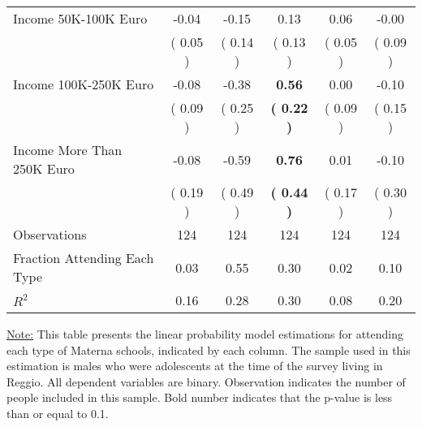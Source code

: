 \begin{table}[H]
{\begin{tabular}{lccccc}
\quad Income 50K-100K Euro &     -0.04 &     -0.15 &      0.13 &      0.06 &     -0.00 \\
\quad  & (     0.05 ) & (     0.14 )  & (     0.13 )  & (     0.05 ) & (     0.09 ) \\
\quad Income 100K-250K Euro &     -0.08 &     -0.38 & \textbf{     0.56} &      0.00 &     -0.10 \\
\quad  & (     0.09 ) & (     0.25 )  & \textbf{(     0.22 )}  & (     0.09 ) & (     0.15 ) \\
\quad Income More Than 250K Euro &     -0.08 &     -0.59 & \textbf{     0.76} &      0.01 &     -0.10 \\
\quad  & (     0.19 ) & (     0.49 )  & \textbf{(     0.44 )}  & (     0.17 ) & (     0.30 ) \\
\midrule
Observations & 124 & 124 & 124 & 124 & 124 \\
Fraction Attending Each Type &      0.03 &      0.55 &      0.30 &      0.02 &      0.10 \\
\midrule
$ R^2$ &      0.16 &      0.28 &      0.30 &      0.08 &      0.20 \\
\bottomrule
\end{tabular}}
\end{table}
\begin{footnotesize}
\noindent\underline{Note:} This table presents the linear probability model estimations for attending each type of Materna schools, indicated by each column. The sample used in this estimation is males who were adolescents at the time of the survey living in Reggio. All dependent variables are binary. Observation indicates the number of people included in this sample. Bold number indicates that the p-value is less than or equal to 0.1.
\end{footnotesize}
